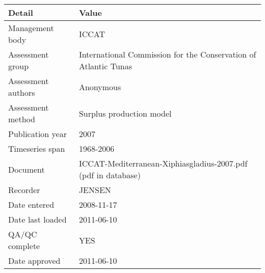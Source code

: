 \begin{table}[htb]
\centering
\begin{tabular}{lp{7cm}}
\toprule
Detail & Value \\
\midrule
Management body    & ICCAT                                                           \\
Assessment group   & International Commission for the Conservation of Atlantic Tunas \\
Assessment authors & Anonymous                                                       \\
Assessment method  & Surplus production model                                        \\
Publication year   & 2007                                                            \\
Timeseries span    & 1968-2006                                                       \\
Document           & ICCAT-Mediterranean-Xiphiasgladius-2007.pdf (pdf in database)   \\
Recorder           & JENSEN                                                          \\
Date entered       & 2008-11-17                                                      \\
Date last loaded   & 2011-06-10                                                      \\
QA/QC complete     & YES                                                             \\
Date approved      & 2011-06-10                                                      \\
\bottomrule
\end{tabular}
\label{tab:assessdet}
\end{table}
